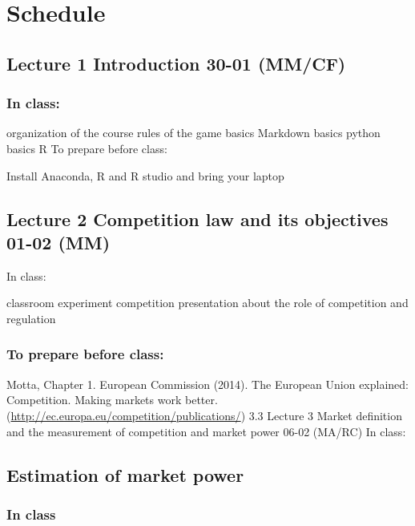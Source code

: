 \documentclass[]{book}
\begin{document}
\chapter{Schedule}\label{schedule}

\section{Lecture 1 Introduction 30-01
(MM/CF)}\label{lecture-1-introduction-30-01-mmcf}

\subsection{In class:}\label{in-class}

organization of the course rules of the game basics Markdown basics
python basics R To prepare before class:

Install Anaconda, R and R studio and bring your laptop

\section{Lecture 2 Competition law and its objectives 01-02
(MM)}\label{lecture-2-competition-law-and-its-objectives-01-02-mm}

In class:

classroom experiment competition presentation about the role of
competition and regulation

\subsection{To prepare before class:}\label{to-prepare-before-class}

Motta, Chapter 1. European Commission (2014). The European Union
explained: Competition. Making markets work better.
(\url{http://ec.europa.eu/competition/publications/}) 3.3 Lecture 3
Market definition and the measurement of competition and market power
06-02 (MA/RC) In class:

\section{Estimation of market power}\label{estimation-of-market-power}

\subsection{In class}\label{in-class-1}
\end{document}
